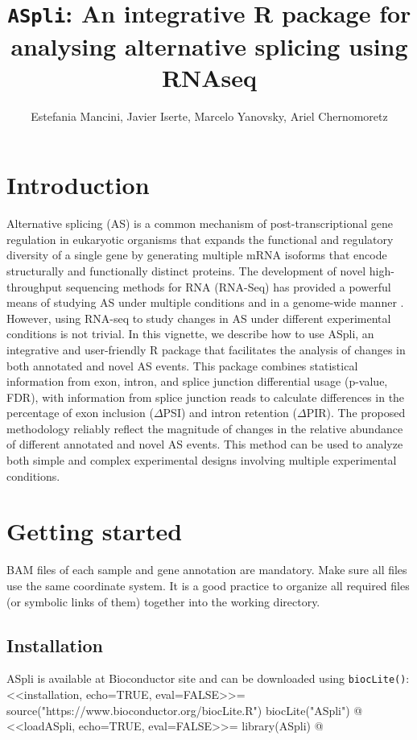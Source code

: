\documentclass{article}
\title{\texttt{ASpli}: An integrative R package for analysing alternative 
  splicing using RNAseq}
\author{Estefania Mancini, Javier Iserte, Marcelo Yanovsky, Ariel Chernomoretz}
\begin{document}

\maketitle

\tableofcontents

\section{Introduction}

Alternative splicing (AS) is a common mechanism of post-transcriptional gene 
regulation in eukaryotic organisms that expands the functional and regulatory 
diversity of a single gene by generating multiple mRNA isoforms that encode 
structurally and functionally distinct proteins. The development of novel 
high-throughput sequencing methods for RNA (RNA-Seq) has provided a powerful 
means of studying AS under multiple conditions and in a genome-wide manner 
\cite{pmid24549677}. However, using RNA-seq to study changes in AS under 
different experimental conditions is not trivial. 
In this vignette, we describe how to use ASpli, an integrative and user-friendly
R package that facilitates the analysis of changes in both annotated and novel 
AS events. This package combines statistical information from exon, intron, and 
splice junction differential usage (p-value, FDR), with information from splice 
junction reads to calculate differences in the percentage of exon inclusion 
($\Delta$PSI) and intron retention ($\Delta$PIR). The proposed methodology 
reliably reflect the magnitude of changes in the relative abundance of different 
annotated and novel AS events. This method can be used to analyze both simple 
and complex experimental designs involving multiple experimental conditions.

\section{Getting started}

BAM files of each sample and gene annotation are mandatory. Make sure all files 
use the same coordinate system. It is a good practice to organize all required 
files (or symbolic links of them) together into the  working directory.

\subsection{Installation}
ASpli is available at Bioconductor site and can be downloaded using
\texttt{biocLite()}:
<<installation, echo=TRUE, eval=FALSE>>=
source("https://www.bioconductor.org/biocLite.R")
biocLite("ASpli")
@
<<loadASpli, echo=TRUE, eval=FALSE>>=
library(ASpli)
@
 
\end{document}
